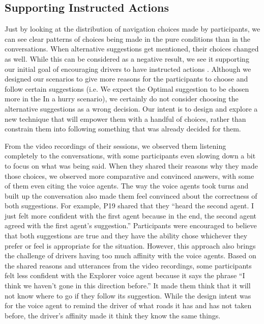 \subsection{Supporting Instructed Actions}
Just by looking at the distribution of navigation choices made by participants, we can see clear patterns of choices being made in the pure conditions than in the conversations. When alternative suggestions get mentioned, their choices changed as well. While this can be considered as a negative result, we see it supporting our initial goal of encouraging drivers to have instructed actions \cite{Brown2012TheGPS}. Although we designed our scenarios to give more reasons for the participants to choose and follow certain suggestions (i.e. We expect the Optimal suggestion to be chosen more in the In a hurry scenario), we certainly do not consider choosing the alternative suggestions as a wrong decision. Our intent is to design and explore a new technique that will empower them with a handful of choices, rather than constrain them into following something that was already decided for them.

From the video recordings of their sessions, we observed them listening completely to the conversations, with some participants even slowing down a bit to focus on what was being said. When they shared their reasons why they made those choices, we observed more comparative and convinced answers, with some of them even citing the voice agents. The way the voice agents took turns and built up the conversation also made them feel convinced about the correctness of both suggestions. For example, P19 shared that they ``heard the second agent. I just felt more confident with the first agent because in the end, the second agent agreed with the first agent's suggestion.'' Participants were encouraged to believe that both suggestions are true and they have the ability chose whichever they prefer or feel is appropriate for the situation.
However, this approach also brings the challenge of drivers having too much affinity with the voice agents. Based on the shared reasons and utterances from the video recordings, some participants felt less confident with the Explorer voice agent because it says the phrase ``I think we haven't gone in this direction before.'' It made them think that it will not know where to go if they follow its suggestion. While the design intent was for the voice agent to remind the driver of what roads it has and has not taken before, the driver's affinity made it think they know the same things. 

